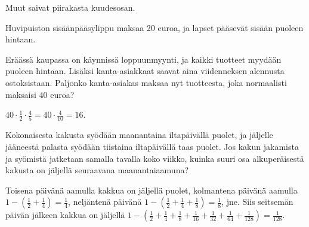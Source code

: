 \begin{tehtavasivu}
\begin{tehtava}
        \begin{vastaus}
            Muut saivat piirakasta kuudesosan.
        \end{vastaus}
    \end{tehtava}
    
\begin{tehtava} %
    Huvipuiston sisäänpääsylippu maksaa 20 euroa, ja lapset pääsevät sisään puoleen hintaan.
	\begin{alakohdat}
    \end{alakohdat}
    \begin{vastaus}
		\begin{alakohdat}
		\end{alakohdat} 
    \end{vastaus}
\end{tehtava}  
  

    
\begin{tehtava}
	Eräässä kaupassa on käynnissä loppuunmyynti, ja kaikki tuotteet
    myydään puoleen hintaan. Lisäksi kanta-asiakkaat saavat aina
    viidenneksen alennusta ostoksistaan.
	Paljonko kanta-asiakas maksaa nyt tuotteesta, joka normaalisti
    maksaisi 40 euroa?
    \begin{vastaus}
		$40\cdot \frac{1}{2} \cdot \frac{4}{5}=40\cdot \frac{4}{10}= 16$. 
	\end{vastaus}
\end{tehtava}
    
\begin{tehtava}
	Kokonaisesta kakusta syödään maanantaina iltapäivällä puolet, ja jäljelle
	jääneestä palasta syödään tiistaina iltapäivällä taas puolet.
	Jos kakun jakamista ja syömistä jatketaan samalla tavalla koko viikko,
	kuinka suuri osa alkuperäisestä kakusta on
	jäljellä seuraavana maanantaiaamuna?
	\begin{vastaus}
		Toisena päivänä aamulla kakkua on jäljellä puolet, kolmantena
		päivänä aamulla
		$1-\left(\frac{1}{2} + \frac{1}{4}\right) = \frac{1}{4}$, 
		neljäntenä päivänä
		$1-\left(\frac{1}{2} + \frac{1}{4} + \frac{1}{8}\right)
		= \frac{1}{8}$, jne.
		Siis seitsemän päivän jälkeen kakkua on jäljellä
		$1-\left(\frac{1}{2} + \frac{1}{4} + \frac{1}{8} +
		\frac{1}{16} + \frac{1}{32} + \frac{1}{64} + \frac{1}{128}\right)
		= \frac{1}{128}$.  
	\end{vastaus}
\end{tehtava}



\end{tehtavasivu}
